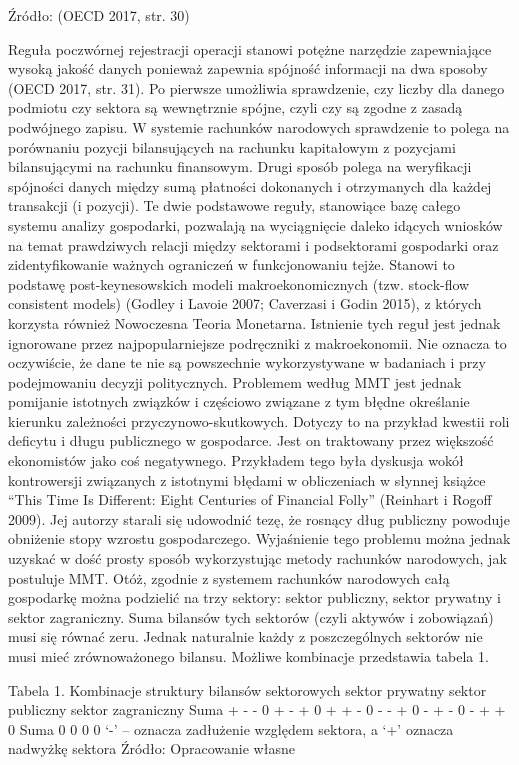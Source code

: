 \documentclass[
]{book}
\begin{document}
Źródło: (OECD 2017, str. 30)

Reguła poczwórnej rejestracji operacji stanowi potężne narzędzie zapewniające wysoką jakość danych ponieważ zapewnia spójność informacji na dwa sposoby (OECD 2017, str. 31). Po pierwsze umożliwia sprawdzenie, czy liczby dla danego podmiotu czy sektora są wewnętrznie spójne, czyli czy są zgodne z zasadą podwójnego zapisu. W systemie rachunków narodowych sprawdzenie to polega na porównaniu pozycji bilansujących na rachunku kapitałowym z pozycjami bilansującymi na rachunku finansowym. Drugi sposób polega na weryfikacji spójności danych między sumą płatności dokonanych i otrzymanych dla każdej transakcji (i pozycji). Te dwie podstawowe reguły, stanowiące bazę całego systemu analizy gospodarki, pozwalają na wyciągnięcie daleko idących wniosków na temat prawdziwych relacji między sektorami i podsektorami gospodarki oraz zidentyfikowanie ważnych ograniczeń w funkcjonowaniu tejże. Stanowi to podstawę post-keynesowskich modeli makroekonomicznych (tzw. stock-flow consistent models) (Godley i Lavoie 2007; Caverzasi i Godin 2015), z których korzysta również Nowoczesna Teoria Monetarna. Istnienie tych reguł jest jednak ignorowane przez najpopularniejsze podręczniki z makroekonomii. Nie oznacza to oczywiście, że dane te nie są powszechnie wykorzystywane w badaniach i przy podejmowaniu decyzji politycznych. Problemem według MMT jest jednak pomijanie istotnych związków i częściowo związane z tym błędne określanie kierunku zależności przyczynowo-skutkowych. Dotyczy to na przykład kwestii roli deficytu i długu publicznego w gospodarce. Jest on traktowany przez większość ekonomistów jako coś negatywnego. Przykładem tego była dyskusja wokół kontrowersji związanych z istotnymi błędami w obliczeniach w słynnej książce ``This Time Is Different: Eight Centuries of Financial Folly'' (Reinhart i Rogoff 2009). Jej autorzy starali się udowodnić tezę, że rosnący dług publiczny powoduje obniżenie stopy wzrostu gospodarczego. Wyjaśnienie tego problemu można jednak uzyskać w dość prosty sposób wykorzystując metody rachunków narodowych, jak postuluje MMT. Otóż, zgodnie z systemem rachunków narodowych całą gospodarkę można podzielić na trzy sektory: sektor publiczny, sektor prywatny i sektor zagraniczny. Suma bilansów tych sektorów (czyli aktywów i zobowiązań) musi się równać zeru. Jednak naturalnie każdy z poszczególnych sektorów nie musi mieć zrównoważonego bilansu. Możliwe kombinacje przedstawia tabela 1.

Tabela 1. Kombinacje struktury bilansów sektorowych sektor prywatny sektor publiczny sektor zagraniczny Suma + - - 0 + - + 0 + + - 0 - - + 0 - + - 0 - + + 0 Suma 0 0 0 0 `-' -- oznacza zadłużenie względem sektora, a `+' oznacza nadwyżkę sektora Źródło: Opracowanie własne
\end{document}
